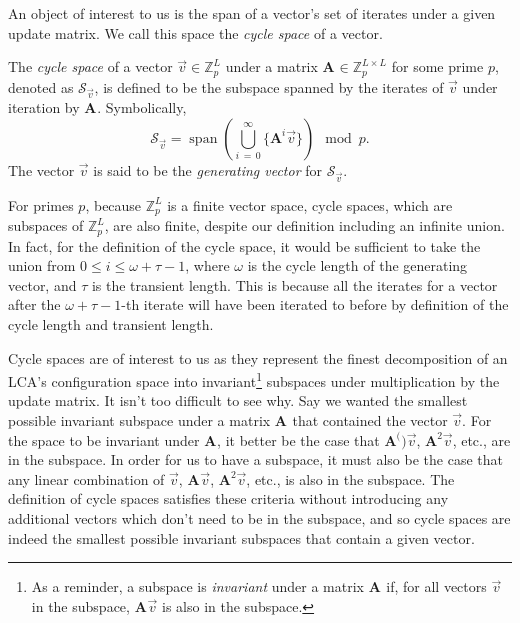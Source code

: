 \documentclass[a4paper, 12pt, reqno]{amsart}
\DeclareMathOperator{\Span}{span}
\newcommand{\Z}{\mathbb{Z}}
\newcommand\Mat[2][]{\mathbf{#1}^{\!#2}}
\newcommand{\cycsp}[1]{\mathcal{S}_{#1}}
\begin{document}
	An object of interest to us is the span of a vector's set of iterates under a given update matrix. We call this space the \emph{cycle space} of a vector.
	
	\begin{defn}
		The \emph{cycle space} of a vector $\vec{v} \in \Z_p^L$ under a matrix $\Mat[A]{} \in \Z_p^{L \times L}$ for some prime $p$, denoted as $\cycsp{\vec{v}}$, is 
		defined to be the subspace spanned by the iterates of $\vec{v}$ under iteration by $\Mat[A]{}$. Symbolically,
		\[
			\cycsp{\vec{v}} = \Span\!\left(\bigcup_{i\,=\,0}^{\infty} \{\Mat[A]{i}\vec{v}\}\right) \mod{p}.
		\]
		The vector $\vec{v}$ is said to be the \emph{generating vector} for $\cycsp{\vec{v}}$.
	\end{defn}
	
	For primes $p$, because $\Z_p^L$ is a finite vector space, cycle spaces, which are subspaces of $\Z_p^L$, are also finite, despite our definition including an infinite
	union. In fact, for the definition of the cycle space, it would be sufficient to take the union from $0 \leq i \leq \omega+\tau-1$, where $\omega$ is the cycle length of 
	the generating vector, and $\tau$ is the transient length. This is because all the iterates for a vector after the $\omega+\tau-1$-th iterate will have been iterated to 
	before by definition of the cycle length and transient length.
	
	Cycle spaces are of interest to us as they represent the finest decomposition of an LCA's configuration space into invariant\footnote{As a reminder, a subspace is 
	\emph{invariant} under a matrix $\Mat[A]{}$ if, for all vectors $\vec{v}$ in the subspace, $\Mat[A]{}\vec{v}$ is also in the subspace.} subspaces under multiplication by 
	the update matrix. It isn't too difficult to see why. Say we wanted the smallest possible invariant subspace under a matrix $\Mat[A]{}$ that contained the vector 
	$\vec{v}$. For the space to be invariant under $\Mat[A]{}$, it better be the case that $\Mat[A]()\vec{v}$, $\Mat[A]{2}\vec{v}$, etc., are in the subspace. In order for us 
	to have a subspace, it must also be the case that any linear combination of $\vec{v}$, $\Mat[A]{}\vec{v}$, $\Mat[A]{2}\vec{v}$, etc., is also in the subspace. The 
	definition of cycle spaces satisfies these criteria without introducing any additional vectors which don't need to be in the subspace, and so cycle spaces are indeed the
	smallest possible invariant subspaces that contain a given vector.
	
\end{document}
